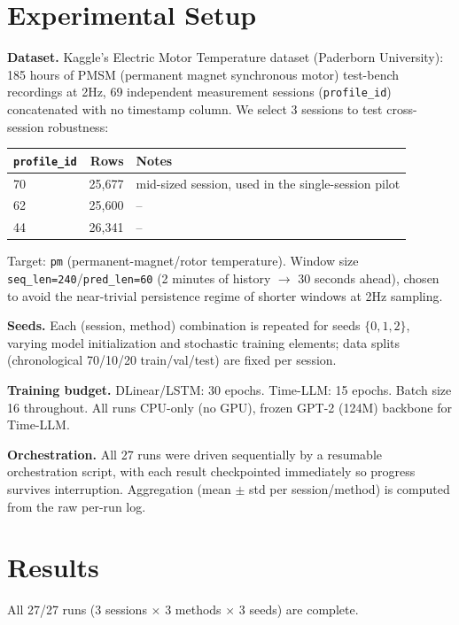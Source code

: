 \documentclass[11pt]{article}
\newcommand{\code}[1]{\texttt{#1}}
\begin{document}
\section{Experimental Setup}

\textbf{Dataset.} Kaggle's Electric Motor Temperature dataset
\citep{kagglemotor,kirchgassner2021motor} (Paderborn University): 185 hours
of PMSM (permanent magnet synchronous motor) test-bench recordings at 2Hz,
69 independent measurement sessions (\code{profile\_id}) concatenated with
no timestamp column. We select 3 sessions to test cross-session robustness:

\begin{center}
\begin{tabular}{@{}lrl@{}}
\toprule
\code{profile\_id} & Rows & Notes \\
\midrule
70 & 25{,}677 & mid-sized session, used in the single-session pilot \\
62 & 25{,}600 & -- \\
44 & 26{,}341 & -- \\
\bottomrule
\end{tabular}
\end{center}

Target: \code{pm} (permanent-magnet/rotor temperature). Window size
\code{seq\_len=240}/\code{pred\_len=60} (2 minutes of history \(\to\) 30
seconds ahead), chosen to avoid the near-trivial persistence regime of
shorter windows at 2Hz sampling.

\textbf{Seeds.} Each (session, method) combination is repeated for seeds
\(\{0, 1, 2\}\), varying model initialization and stochastic training
elements; data splits (chronological 70/10/20 train/val/test) are fixed per
session.

\textbf{Training budget.} DLinear/LSTM: 30 epochs. Time-LLM: 15 epochs.
Batch size 16 throughout. All runs CPU-only (no GPU), frozen GPT-2 (124M)
backbone for Time-LLM.

\textbf{Orchestration.} All 27 runs were driven sequentially by a resumable
orchestration script, with each result checkpointed immediately so progress
survives interruption. Aggregation (mean \(\pm\) std per session/method) is
computed from the raw per-run log.

\section{Results}
\label{sec:results}

All 27/27 runs (3 sessions \(\times\) 3 methods \(\times\) 3 seeds) are
complete.
\end{document}
